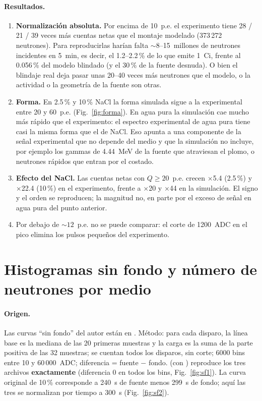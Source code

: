 \documentclass[11pt,a4paper]{article}
\begin{document}
\paragraph{Resultados.}
\begin{enumerate}
\item \textbf{Normalización absoluta.} Por encima de 10~p.e. el experimento tiene 28 / 21 / 39 veces más cuentas netas que el
montaje modelado (373\,272 neutrones). Para reproducirlas harían falta ${\sim}$8--15~millones de neutrones incidentes en 5~min,
es decir, el 1.2--2.2\,\% de lo que emite 1~Ci, frente al 0.056\,\% del modelo blindado (y el 30\,\% de la fuente desnuda). O bien
el blindaje real deja pasar unas 20--40 veces más neutrones que el modelo, o la actividad o la geometría de la fuente son otras.
\item \textbf{Forma.} En 2.5\,\% y 10\,\% NaCl la forma simulada sigue a la experimental entre 20 y 60~p.e. (Fig.~\ref{fig:forma}).
En agua pura la simulación cae mucho más rápido que el experimento: el espectro experimental de agua pura tiene casi la misma
forma que el de NaCl. Eso apunta a una componente de la señal experimental que no depende del medio y que la simulación no
incluye, por ejemplo los gammas de 4.44~MeV de la fuente que atraviesan el plomo, o neutrones rápidos que entran por el costado.
\item \textbf{Efecto del NaCl.} Las cuentas netas con $Q\geq20$~p.e. crecen $\times$5.4 (2.5\,\%) y $\times$22.4 (10\,\%) en el experimento,
frente a $\times$20 y $\times$44 en la simulación. El signo y el orden se reproducen; la magnitud no, en parte por el exceso
de señal en agua pura del punto anterior.
\item Por debajo de ${\sim}12$~p.e. no se puede comparar: el corte de 1200~ADC en el pico elimina los pulsos pequeños del experimento.
\end{enumerate}

\section{Histogramas sin fondo y número de neutrones por medio}
\paragraph{Origen.} Las curvas ``sin fondo'' del autor están en
.
Método: para cada disparo, la línea base es la mediana de las 20 primeras muestras y la carga es la suma de la parte positiva de
las 32 muestras; se cuentan todos los disparos, sin corte; 6000 bins entre 10 y 60\,000~ADC; diferencia = fuente $-$ fondo.
 (con ) reproduce los tres archivos
\textbf{exactamente} (diferencia 0 en todos los bins, Fig.~\ref{fig:sf1}). La curva original de 10\,\% corresponde a 240~s de
fuente menos 299~s de fondo; aquí las tres se normalizan por tiempo a 300~s (Fig.~\ref{fig:sf2}).
\end{document}
